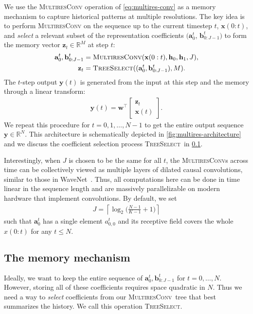 \documentclass{article}
\newcommand{\reals}{\mathbb{R}}
\theoremstyle{plain}
\theoremstyle{definition}
\theoremstyle{remark}
\newcommand{\treeselect}{\textsc{TreeSelect}}
\newcommand{\ourconv}{\textsc{MultiresConv}}
\begin{document}
We use the \textsc{MultiresConv} operation of \cref{eq:multires-conv} as a memory mechanism to capture historical patterns at multiple resolutions. 
The key idea is to perform \textsc{MultiresConv} on the sequence up to the current timestep $t$, $\mathbf x(0:t)$, and \emph{select} a relevant subset of the representation coefficients $(\mathbf a^{t}_{0}$, $\mathbf b_{0:J-1}^{t})$ to form the memory vector $\mathbf z_t \in \reals^M$ at step $t$: 
\begin{align}
\mathbf a_0^{t}, \mathbf b_{0:J-1}^{t} &= \textsc{MultiresConv}(\mathbf x(0:t), \mathbf h_0, \mathbf h_1, J), \label{eq:seq-multiresconv} \\
\mathbf z_t &= \treeselect((\mathbf a_0^{t}, \mathbf b_{0:J-1}^{t}), M).\label{eqn:treeselect}
\end{align}
The $t$-step output $\mathbf y(t)$ is generated from the input at this step and the memory through a linear transform: 
\begin{align*}
\mathbf y(t) = \mathbf w^\top \begin{bmatrix}
\mathbf z_t \\
\mathbf x(t) 
\end{bmatrix}.
\end{align*} 
We repeat this procedure for $t=0, 1, \dots, N-1$ to get the entire output sequence $\mathbf y \in \mathbb{R}^N$. 
This architecture is schematically depicted in \cref{fig:multires-architecture} and
we discuss the coefficient selection process \treeselect\ in \cref{sec:memory}.

Interestingly, when $J$ is chosen to be the same for all $t$, the \ourconv s across time can be collectively viewed as multiple layers of dilated causal convolutions, similar to those in WaveNet~\citep{oord2016wavenet}. 
Thus, all computations here can be done in time linear in the sequence length and are massively parallelizable on modern hardware that implement convolutions. 
By default, we set
\begin{align} \label{eq:J-value}
    J = \left\lceil\log_2\Big(\frac{N - 1}{K - 1} + 1\Big)\right \rceil
\end{align}
such that $\mathbf{a}^t_0$ has a single element $a_{0,0}^t$ and its receptive field covers the whole $x(0:t)$ for any $t \leq N$. 




\subsection{The memory mechanism}\label{sec:memory}
Ideally, we want to keep the entire sequence of $\mathbf a_0^{t}, \mathbf b_{0:J-1}^{t}$ for $t=0,\ldots, N$.
However, 
storing all of these coefficients requires space quadratic in $N$. Thus we need a way to \emph{select} coefficients from our \ourconv\ tree that best summarizes the history. 
We call this operation \treeselect.
\end{document}
